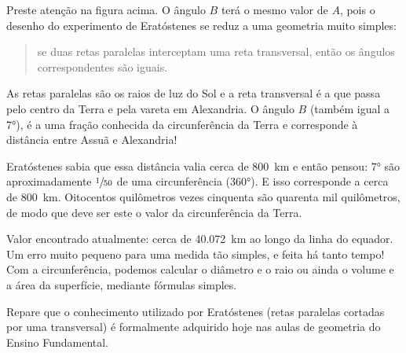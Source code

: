 Preste atenção na figura acima. O ângulo $B$ terá o mesmo valor de
$A$, pois o desenho do experimento de Eratóstenes se reduz a uma
geometria muito simples:
\begin{quotation}
  \noindent
  se duas retas paralelas interceptam uma reta
  transversal, então os ângulos correspondentes são iguais.
\end{quotation}

As retas paralelas são os raios de luz do Sol e a reta transversal é a que
passa pelo centro da Terra e pela vareta em Alexandria. O ângulo $B$ (também
igual a \ang{7}), é a uma fração conhecida da circunferência da Terra e
corresponde à distância entre Assuã e Alexandria!

Eratóstenes sabia que essa distância valia cerca de \SI{800}{\kilo\meter}
e então pensou: \ang{7} são aproximadamente \(\sfrac{1}{50}\)
de uma circunferência (\ang{360}).
E isso corresponde a cerca de \SI{800}{\kilo\meter}.
Oitocentos quilômetros vezes cinquenta são quarenta mil quilômetros,
de modo que deve ser este o valor da circunferência da Terra.

Valor encontrado atualmente: cerca de \SI{40.072}{\kilo\meter}
ao longo da linha do equador.
Um erro muito pequeno para uma medida tão simples, e feita há tanto tempo! Com
a circunferência, podemos calcular o diâmetro e o raio ou ainda o volume e a
área da superfície, mediante fórmulas simples.

Repare que o conhecimento utilizado por Eratóstenes (retas paralelas cortadas
por uma transversal) é formalmente adquirido hoje nas aulas de geometria do
Ensino Fundamental.


